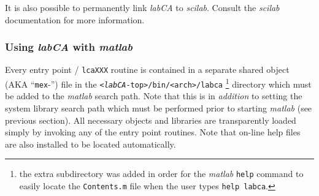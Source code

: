 \documentclass{article}
\newcommand{\sca}{\ita{labCA}}
\newcommand{\scilab}{\ita{scilab}}
\newcommand{\matlab}{\ita{matlab}}
\newcommand{\com}[1]{{\tt #1}}
\newcommand{\ita}[1]{\emph{#1}}
\begin{document}
It is also possible to permanently link \sca{} to \scilab{}. Consult
the \scilab{} documentation for more information.

\subsubsection{Using \sca{} with \matlab}
Every entry point / \com{lcaXXX} routine 
is contained in a separate
shared object (AKA ``\com{mex}-'') file in the \com{<\sca-top>/bin/<arch>/labca}%
\footnote{
the extra subdirectory was added in order for the \matlab{} \com{help} command
to easily locate the \com{Contents.m} file when the user types \com{help labca}.
} directory
which must be added to the \matlab{} search path.
Note that this is in \ita{addition}
to setting the system library search path which must be performed prior
to starting \matlab{} (see previous section).
All necessary objects and libraries are transparently loaded simply
by invoking any of the entry point routines. Note that on-line help
files are also installed to be located automatically.
\end{document}
